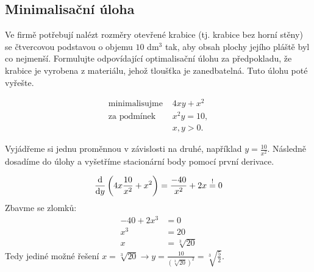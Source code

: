 \subsection{Minimalisační úloha}
Ve firmě potřebují nalézt rozměry otevřené krabice (tj. krabice bez horní stěny) se čtvercovou podstavou o objemu $10$
d$\text{m}^3$ tak, aby obsah plochy jejího pláště byl co nejmenší. Formulujte odpovídající optimalisační úlohu za
předpokladu, že krabice je vyrobena z materiálu, jehož tloušťka je zanedbatelná. Tuto úlohu poté vyřešte.

\begin{center}
\end{center}
\begin{align*}
    \text{minimalisujme } &4xy + x^2\\
    \text{za podmínek } &  x^2 y = 10, \\
    & x,y > 0.
\end{align*}

Vyjádřeme si jednu proměnnou v závislosti na druhé, například $y = \frac{10}{x^2}$. Následně dosadíme do úlohy a vyšetříme
stacionární body pomocí první derivace.

\[
    \frac{\mathop{}\!\mathrm{d}}{\mathop{}\!\mathrm{d} y} \left(4x \frac{10}{x^2} + x^2\right)= \frac{-40}{x^2} + 2x \stackrel{!}{=} 0
\]
Zbavme se zlomků:
\begin{align*}
    -40 + 2x^3 &= 0 \\
    x^3 &= 20  \\
    x &= \sqrt[3]{20}
\end{align*}
Tedy jediné možné řešení $x = \sqrt[3]{20} \rightarrow y = \frac{10}{\left(\sqrt[3]{20}\right)^2} =  \sqrt[3]{\frac{5}{2}}$.

%

